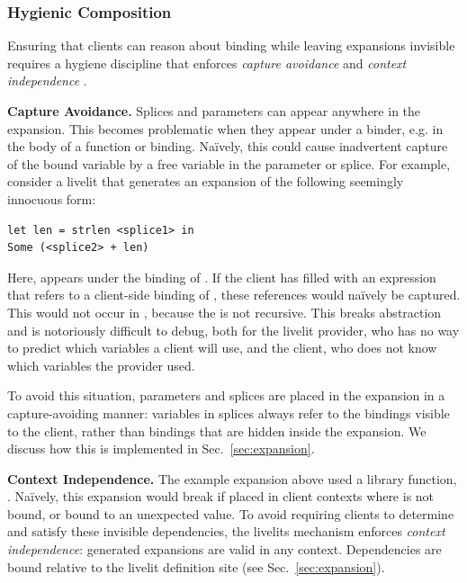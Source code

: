 
\subsubsection{Hygienic Composition}\label{sec:hygiene}


Ensuring that clients can reason about binding while leaving expansions
 invisible
 requires a hygiene discipline that enforces \emph{capture avoidance}
and \emph{context independence} \cite{TLMs}.

\textbf{Capture Avoidance.}
Splices and parameters can appear anywhere in the expansion.
This becomes problematic when
they appear under a binder, e.g. in the body of a function or  binding.
Na\"ively, this could cause inadvertent capture of the bound variable by a free variable
in the parameter or splice. For example, consider a livelit that generates an expansion
of the following seemingly innocuous form:
\begin{lstlisting}[numbers=none]
let len = strlen <splice1> in
Some (<splice2> + len)
\end{lstlisting}
Here,  appears under the binding of . If the client has filled
 with an expression that refers to a client-side binding of ,
these references would na\"ively be captured. This would not occur in ,
because the  is not recursive.
This breaks abstraction and is notoriously difficult to debug,
both for the livelit provider, who has no way to predict which variables a client will use,
 and the client, who does not know which variables the provider used.

To avoid this situation, parameters and splices are placed in the expansion
in a capture-avoiding manner: variables in splices
always refer to the bindings visible to the client,
rather than bindings that are hidden inside the expansion.
We discuss how this is implemented in Sec.~\ref{sec:expansion}.

\textbf{Context Independence.}
The example expansion above used a library function, .
Na\"ively, this expansion would break if placed
in client contexts where  is not bound, or bound to
an unexpected value.
To avoid requiring clients to determine and satisfy these invisible
dependencies, the livelits mechanism enforces \emph{context independence}:
generated expansions are valid in any context. Dependencies are bound
relative to the livelit definition site (see Sec.~\ref{sec:expansion}).

